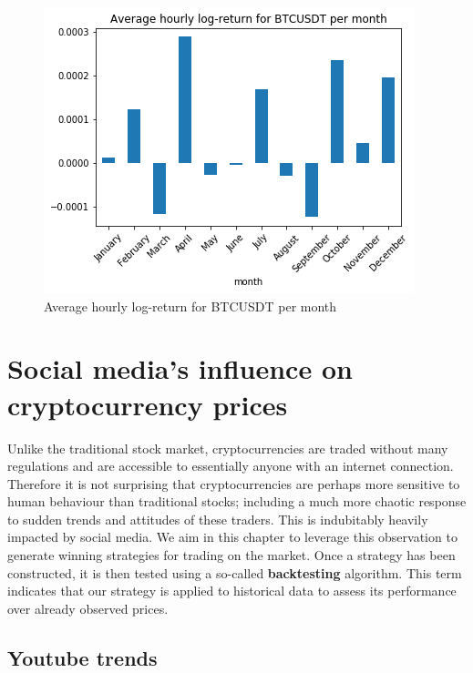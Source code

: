 \documentclass[twoside]{report}
\begin{document}
\begin{spacing}{1}
\begin{figure}[!htbp]
    \centering
    \includegraphics[width=0.7\linewidth]{Images/Average hourly log-return for BTCUSDT per month.png}
    \caption{Average hourly log-return for BTCUSDT per month}
    \label{Average hourly log-return for BTCUSDT per month}
\end{figure}








\chapter{Social media's influence on cryptocurrency prices}

Unlike the traditional stock market, cryptocurrencies are traded without many regulations and are accessible to essentially anyone with an internet connection. Therefore it is not surprising that cryptocurrencies are perhaps more sensitive to human behaviour than traditional stocks; including a much more chaotic response to sudden trends and attitudes of these traders. This is indubitably heavily impacted by social media. We aim in this chapter to leverage this observation to generate winning strategies for trading on the market. Once a strategy has been constructed, it is then tested using a so-called \textbf{backtesting} algorithm. This term indicates that our strategy is applied to historical data to assess its performance over already observed prices.  

\section{Youtube trends}\label{YT Trends}


\end{spacing}
\end{document}
